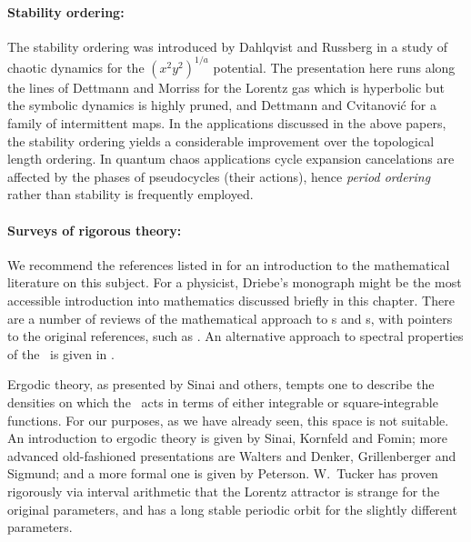 

\paragraph{Stability ordering:}
The stability ordering was introduced by
Dahlqvist and Russberg in a study of chaotic dynamics for the
$(x^2y^2)^{1/a}$ potential.
The presentation here runs along the lines of
Dettmann and Morriss for the Lorentz gas
which is hyperbolic but the symbolic dynamics is highly pruned, and
Dettmann and Cvitanovi\'c for a family of intermittent maps.
In
the
applications discussed in the above papers, the stability ordering
yields a considerable improvement over the topological length
ordering. In quantum chaos applications cycle expansion cancelations
are affected by the phases of pseudocycles (their actions), hence
{\em period ordering} rather than stability is frequently employed.


\paragraph{Surveys of rigorous theory:}\label{rem:rig-z}
We recommend the references listed in 
for an introduction to
the mathematical literature on this subject.
For a physicist, Driebe's monograph
might be the most accessible
introduction into mathematics discussed briefly in this chapter.
There are a number of reviews of the mathematical approach to
\dzeta s and \Fd s, with pointers to the original references,
such as . An alternative approach to spectral
properties of the \FPoper\ is given in .

Ergodic theory, as presented by Sinai and others,
tempts one to describe the densities on which the \evOper\ acts
in terms of either
integrable or square-integrable functions. For our
purposes, as we have already seen,
this space is not suitable.
An introduction to ergodic theory is given by
Sinai, Kornfeld and Fomin; more advanced
old-fashioned  presentations are Walters
and Denker, Grillenberger and Sigmund; and a more formal
one is given by Peterson.
W.~Tucker has proven rigorously via interval
     arithmetic that the Lorentz attractor is strange for
     the original parameters, and has a long stable periodic orbit for
     the slightly different parameters.
